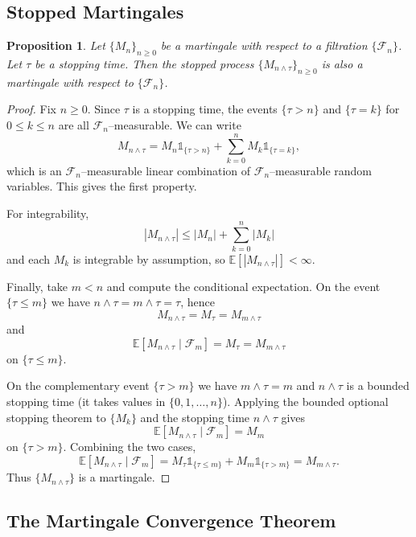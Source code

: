 \documentclass{tufte-handout}
\newcommand*\E{\mathbb{E}}
\newtheorem{prop}[thm]{Proposition}
\theoremstyle{definition}
\begin{document}
\subsection{Stopped Martingales}

\begin{prop}
	Let $\{M_n\}_{n \ge 0}$ be a martingale with respect to a filtration
	$\{\mathscr{F}_n\}$. Let $\tau$ be a stopping time. Then the stopped process
	$\{M_{n \wedge \tau}\}_{n \ge 0}$ is also a martingale with respect to
	$\{\mathscr{F}_n\}$.
\end{prop}

\begin{proof}
	Fix $n \ge 0$. Since $\tau$ is a stopping time, the events
	$\{\tau > n\}$ and $\{\tau = k\}$ for $0 \le k \le n$ are all
	$\mathscr{F}_n$–measurable. We can write
	\[
		M_{n \wedge \tau}
		= M_n \mathds{1}_{\{\tau > n\}}
		+ \sum_{k=0}^{n} M_k \mathds{1}_{\{\tau = k\}}
	,\] 
	which is an $\mathscr{F}_n$–measurable linear combination of
	$\mathscr{F}_n$–measurable random variables. This gives the first property.

	For integrability,
	\[
		\left| M_{n \wedge \tau} \right|
		\le \left| M_n \right| + \sum_{k=0}^{n} \left| M_k \right|
	\]
	and each $M_k$ is integrable by assumption, so
	$\E\left[ \left| M_{n \wedge \tau} \right| \right] < \infty$.

	Finally, take $m < n$ and compute the conditional expectation. On the event
	$\{\tau \le m\}$ we have $n \wedge \tau = m \wedge \tau = \tau$, hence
	\[
		M_{n \wedge \tau} = M_\tau = M_{m \wedge \tau}
	\]
	and
	\[
		\E\left[ M_{n \wedge \tau} \mid \mathscr{F}_m \right]
		= M_\tau = M_{m \wedge \tau}
	\]
	on $\{\tau \le m\}$.

	On the complementary event $\{\tau > m\}$ we have $m \wedge \tau = m$ and
	$n \wedge \tau$ is a bounded stopping time (it takes values in
	$\{0,1,\ldots,n\}$). Applying the bounded optional stopping theorem to
	$\{M_k\}$ and the stopping time $n \wedge \tau$ gives
	\[
		\E\left[ M_{n \wedge \tau} \mid \mathscr{F}_m \right]
		= M_m
	\]
	on $\{\tau > m\}$. Combining the two cases,
	\[
		\E\left[ M_{n \wedge \tau} \mid \mathscr{F}_m \right]
		= M_\tau \mathds{1}_{\{\tau \le m\}} + M_m \mathds{1}_{\{\tau > m\}}
		= M_{m \wedge \tau}
	.\] 
	Thus $\{M_{n \wedge \tau}\}$ is a martingale.
\end{proof}

\subsection{The Martingale Convergence Theorem}
\end{document}
